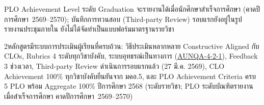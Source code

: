 \begin{weaknessbox}
PLO Achievement Level ระดับ Graduation จะรายงานได้เมื่อนักศึกษาสำเร็จการศึกษา (คาดปีการศึกษา~2569--2570); บันทึกการทวนสอบ (Third-party Review) รอบแรกยังอยู่ในรูปรายงานประชุมภายใน ยังไม่ได้จัดทำเป็นแบบฟอร์มมาตรฐานรายวิชา
\end{weaknessbox}

\begin{selfassessmentbox}{2}{หลักสูตรมีระบบการประเมินผู้เรียนที่ครบถ้วน: วิธีประเมินหลากหลาย Constructive Aligned กับ CLOs, Rubrics 4 ระดับทุกวิชาบังคับ, ระบบอุทธรณ์เป็นทางการ (\hyperlink{ref:AUNQA-4-2-1}{AUNQA-4-2-1}), Feedback 3 ช่วงเวลา, Third-party Review ดำเนินการรอบแรกแล้ว (27 มี.ค. 2569), CLO Achievement 100\% ทุกวิชาบังคับยืนยันจาก มคอ.5, และ PLO Achievement Criteria ครบ 5 PLO พร้อม Aggregate 100\% ปีการศึกษา 2568 (ระดับรายวิชา; PLO ระดับบัณฑิตรายงานเมื่อสำเร็จการศึกษา คาดปีการศึกษา~2569--2570)}
\end{selfassessmentbox}

